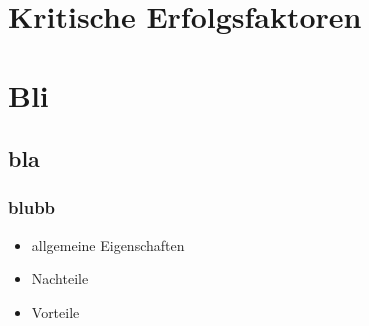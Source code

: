\documentclass[a4paper, 12pt]{article}
\begin{document}
\section{Kritische Erfolgsfaktoren}






\section{Bli}


\subsection{bla}

\subsubsection*{blubb}

\begin{itemize}
  \item allgemeine Eigenschaften
\end{itemize}
\begin{itemize}
  \renewcommand{\labelitemi}{\(-\)}%
  \item Nachteile
\end{itemize}
\begin{itemize}
  \renewcommand{\labelitemi}{+}%
  \item Vorteile
\end{itemize}
\end{document}
